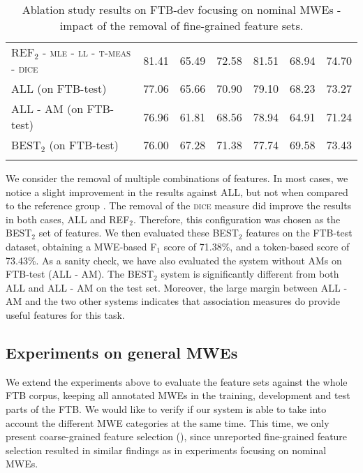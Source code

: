 \documentclass[output=paper,
modfonts
]{langscibook}
\begin{document}
\begin{table*}
\begin{tabular}{l@{~~~}c@{~~~}c@{~~~}c@{~~~~~~~~}c@{~~~}c@{~~~}c}
\textsc{REF$_2$} - \textsc{mle} - \textsc{ll} - \textsc{t-meas} - \textsc{dice} & 81.41 & 65.49 & 72.58 & 81.51 & 68.94 & 74.70 \\ %
\lspbottomrule
\textsc{ALL} (on FTB-test) & 77.06 & 65.66 & 70.90 & 79.10 & 68.23 & 73.27 \\ 
\textsc{ALL - \textsc{AM}} (on FTB-test) & 76.96 & 61.81 & 68.56 & 78.94 & 64.91 & 71.24 \\ 
\textsc{BEST$_2$} (on FTB-test) & 76.00 & 67.28 & 71.38 & 77.74 & 69.58 & 73.43 \\ 
\lspbottomrule
\end{tabular}
\caption{Ablation study results on FTB-dev focusing on nominal MWEs - impact of the removal of fine-grained feature sets.}
\label{tab:ftbNMWEsFine}
\end{table*}

We consider the removal of multiple combinations of features. In most cases, we notice a slight improvement in the results against ALL, but not when compared to the reference group . %
The removal of the \textsc{dice} measure did improve the results in both cases, ALL and REF$_2$. Therefore, this configuration was chosen as the BEST$_2$ set of features.
We then evaluated these BEST$_2$ features on the FTB-test dataset, obtaining a MWE-based F$_1$ score of 71.38\%, and a token-based score of 73.43\%. As a sanity check, we have also evaluated the system without AMs on FTB-test (\textsc{ALL - \textsc{AM}}). The \textsc{BEST$_2$} system is significantly different from both \textsc{ALL} and \textsc{ALL - \textsc{AM}} on the test set. Moreover, the large margin between \textsc{ALL - \textsc{AM}} and the two other systems indicates that association measures do provide useful features for this task.



\subsection{Experiments on general MWEs}
\label{schol:sec:results-general}

We extend the experiments above to evaluate the feature sets against the whole FTB corpus, keeping all annotated MWEs in the training, development and test parts of the FTB. We would like to verify if our system is able to take into account the different MWE categories at the same time. This time, we only present coarse-grained feature selection (), since unreported fine-grained feature selection resulted in similar findings as in experiments focusing on nominal MWEs.
\end{document}
